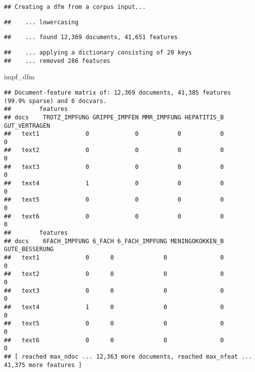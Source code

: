 \documentclass[
]{book}
\newenvironment{Shaded}{\begin{snugshade}}{\end{snugshade}}
\newcommand{\CommentTok}[1]{\textcolor[rgb]{0.56,0.35,0.01}{\textit{#1}}}
\newcommand{\DataTypeTok}[1]{\textcolor[rgb]{0.13,0.29,0.53}{#1}}
\newcommand{\FloatTok}[1]{\textcolor[rgb]{0.00,0.00,0.81}{#1}}
\newcommand{\KeywordTok}[1]{\textcolor[rgb]{0.13,0.29,0.53}{\textbf{#1}}}
\newcommand{\NormalTok}[1]{#1}
\newcommand{\OperatorTok}[1]{\textcolor[rgb]{0.81,0.36,0.00}{\textbf{#1}}}
\newcommand{\StringTok}[1]{\textcolor[rgb]{0.31,0.60,0.02}{#1}}
\begin{document}
\begin{verbatim}
## Creating a dfm from a corpus input...
\end{verbatim}

\begin{verbatim}
##    ... lowercasing
\end{verbatim}

\begin{verbatim}
##    ... found 12,369 documents, 41,651 features
\end{verbatim}

\begin{verbatim}
##    ... applying a dictionary consisting of 20 keys
##    ... removed 286 features
\end{verbatim}

\begin{Shaded}
\begin{Highlighting}[]
\NormalTok{impf_dfm}
\end{Highlighting}
\end{Shaded}

\begin{verbatim}
## Document-feature matrix of: 12,369 documents, 41,385 features (99.9% sparse) and 6 docvars.
##        features
## docs    TROTZ_IMPFUNG GRIPPE_IMPFEN MMR_IMPFUNG HEPATITIS_B GUT_VERTRAGEN
##   text1             0             0           0           0             0
##   text2             0             0           0           0             0
##   text3             0             0           0           0             0
##   text4             1             0           0           0             0
##   text5             0             0           0           0             0
##   text6             0             0           0           0             0
##        features
## docs    6FACH_IMPFUNG 6_FACH 6_FACH_IMPFUNG MENINGOKOKKEN_B GUTE_BESSERUNG
##   text1             0      0              0               0              0
##   text2             0      0              0               0              0
##   text3             0      0              0               0              0
##   text4             1      0              0               0              0
##   text5             0      0              0               0              0
##   text6             0      0              0               0              0
## [ reached max_ndoc ... 12,363 more documents, reached max_nfeat ... 41,375 more features ]
\end{verbatim}

\begin{Shaded}
\end{Shaded}
\end{document}
